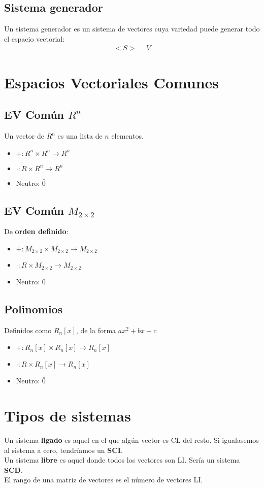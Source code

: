 \documentclass{article}
\begin{document}
\subsection{Sistema generador}
Un sistema generador es un sistema de vectores cuya variedad puede generar todo el espacio vectorial:
\begin{equation}
    \begin{split}
        <S> = V
    \end{split}
\end{equation}
\section{Espacios Vectoriales Comunes}
\subsection{EV Común $R^n$}
Un vector de $R^n$ es una lista de $n$ elementos.
\begin{itemize}
    \item $+: R^n \times R^n \to R^n$
    \item $\cdot : R \times R^n \to R^n$
    \item Neutro: $\bar{0}$
\end{itemize}
\subsection{EV Común $M_{2\times 2}$}
De \textbf{orden definido}:
\begin{itemize}
    \item $+: M_{2\times 2} \times M_{2\times 2} \to M_{2\times 2}$
    \item $\cdot : R \times M_{2\times 2} \to M_{2\times 2}$
    \item Neutro: $\bar{0}$
\end{itemize}
\subsection{Polinomios}
Definidos como $R_{n}[x]$, de la forma $ax^{2}+bx+c$
\begin{itemize}
    \item $+: R_{n}[x] \times R_{n}[x] \to R_{n}[x]$
    \item $\cdot : R \times R_{n}[x] \to R_{n}[x]$
    \item Neutro: $\bar{0}$
\end{itemize}
\section{Tipos de sistemas}
Un sistema \textbf{ligado} es aquel en el que algún vector es CL del resto. Si igualasemos al sistema
a cero, tendríamos un \textbf{SCI}.\\
Un sistema \textbf{libre} es aquel donde todos los vectores son LI. Sería un sistema \textbf{SCD}.\\
El rango de una matriz de vectores es el número de vectores LI.
\end{document}
